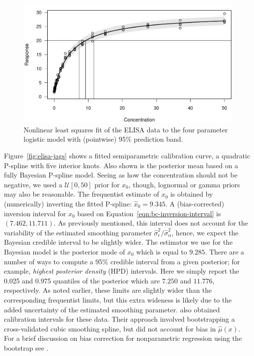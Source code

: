 \documentclass[cmfont,usenames,dvipsnames,leqno]{afit-etd}\usepackage[]{graphicx}\usepackage[]{color}
\makeatletter
\def\maxwidth{ %
  \ifdim\Gin@nat@width>\linewidth
    \linewidth
  \else
    \Gin@nat@width
  \fi
}
\newenvironment{knitrout}{}{} %
\renewenvironment{knitrout}{\begin{singlespace}}{\end{singlespace}}
\newcommand{\mc}[1]{\ensuremath{\mathcal{#1}}}
\newcommand{\wh}[1]{\ensuremath{\widehat{#1}}}
\makeatother
\begin{document}
\begin{knitrout}
\color{fgcolor}\begin{figure}[H]

\includegraphics[width=\maxwidth]{figure/elisa-nls} \caption[Four parameter logistic model for the ELISA data]{Nonlinear least squares fit of the ELISA data to the four parameter logistic model with (pointwise) 95\% prediction band.\label{fig:elisa-nls}}
\end{figure}


\end{knitrout}


Figure~\ref{fig:elisa-jags} shows a fitted semiparametric calibration curve, a quadratic \ac{P-spline} with five interior knots. Also shown is the posterior mean based on a fully Bayesian \ac{P-spline} model. Seeing as how the concentration should not be negative, we used a $\mc{U}[0, 50]$ prior for $x_0$, though, lognormal or gamma priors may also be reasonable. The frequentist estimate of $x_0$ is obtained by (numerically) inverting the fitted \ac{P-spline}: $\wh{x}_0 = 9.345$. A (bias-corrected) inversion interval for $x_0$ based on Equation~\eqref{eqn:bc-inversion-interval} is $(7.462, 11.711)$. As previously mentioned, this interval does not account for the variability of the estimated smoothing parameter $\wh{\sigma}_\epsilon^2/\wh{\sigma}_\alpha^2$, hence, we expect the Bayesian credible interval to be slightly wider. The estimator we use for the Bayesian model is the posterior mode of $x_0$ which is equal to $9.285$. There are a number of ways to compute a 95\% credible interval from a given posterior; for example, \textit{highest posterior density} (HPD) intervals. Here we simply report the 0.025 and 0.975 quantiles of the posterior which are $7.250$ and $11.776$, respectively. As noted earlier, these limits are slightly wider than the corresponding frequentist limits, but this extra wideness is likely due to the added uncertainty of the estimated smoothing parameter. \citet{ori_constructing_1995} also obtained calibration intervals for these data. Their approach involved bootstrapping a cross-validated cubic smoothing spline, but did not account for bias in $\wh{\mu}(x)$. For a brief discussion on bias correction for nonparametric regression using the bootstrap see \citet[pp. 362-366]{davison_bootstrap_1997}.
\end{document}
